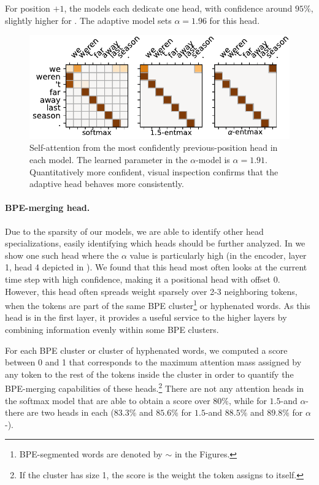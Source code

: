 For position $+1$, the models each dedicate one head, with confidence
around $95\%$, slightly higher for \entmaxtext. The adaptive model
sets $\alpha=1.96$ for this head.

\begin{figure}[t]
    \centering
    \includegraphics[width=0.95\columnwidth]{Figures/head_prev.pdf}
    \caption{
        Self-attention from the most confidently previous-position head in
        each model. The learned parameter in the $\alpha$-\entmaxtext model
        is $\alpha=1.91$. Quantitatively more confident, visual inspection
        confirms that the adaptive head behaves more consistently.}
    \label{fig:head_prev}
\end{figure}

\paragraph*{BPE-merging head.}
Due to the sparsity of our models, we are able to identify other head
specializations, easily identifying which heads should be further analyzed.
In  we show one such head where the $\alpha$ value
is particularly high (in the encoder, layer 1, head 4 depicted in
). We found that this head most often looks at
the current time step with high confidence, making it a positional head
with offset $0$. However, this head often spreads weight sparsely
over 2-3 neighboring tokens, when the tokens are part of the same BPE
cluster\footnote{BPE-segmented words are denoted by $\sim$ in the
    Figures.} or hyphenated words. As this head is in the first layer, it
provides a useful service to the higher layers by combining
information evenly within some BPE clusters.

For each BPE cluster or cluster of hyphenated words,
we computed a score between 0 and 1 that corresponds to the
maximum attention mass assigned by any token to the rest of the
tokens inside the cluster in order to quantify the BPE-merging
capabilities of these heads.\footnote{If the
    cluster has size 1, the score is the weight the token assigns to
    itself.} There are not any attention heads in
the softmax model that are able to obtain a score over $80\%$, while
for $1.5$-\entmaxtext and $\alpha$-\entmaxtext there are two heads
in each ($83.3\%$ and $85.6\%$ for $1.5$-\entmaxtext and $88.5\%$ and
$89.8\%$ for $\alpha$-\entmaxtext).

